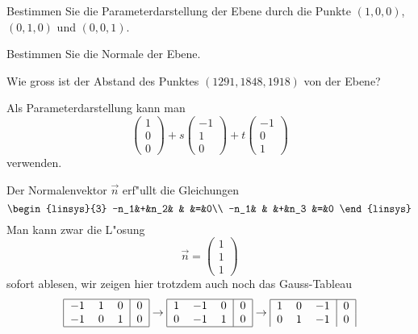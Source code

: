 \begin{teilaufgaben}
\item Bestimmen Sie die Parameterdarstellung der Ebene durch die
Punkte $(1,0,0)$, $(0,1,0)$ und $(0,0,1)$.
\item Bestimmen Sie die Normale der Ebene.
\item Wie gross ist der Abstand des Punktes $(1291, 1848, 1918)$ von
der Ebene?
\end{teilaufgaben}

\begin{loesung}
\begin{teilaufgaben}
\item Als Parameterdarstellung kann man
\[
\begin{pmatrix}1\\0\\0\end{pmatrix}
+s\begin{pmatrix}-1\\1\\0\end{pmatrix}
+t\begin{pmatrix}-1\\0\\1\end{pmatrix}
\]
verwenden.
\item  Der Normalenvektor $\vec n$ erf"ullt die Gleichungen
\[
\begin{linsys}{3}
-n_1&+&n_2& &    &=&0\\
-n_1& &   &+&n_3 &=&0
\end{linsys}
\]
Man kann zwar die L"osung
\[
\vec n=
\begin{pmatrix}1\\1\\1\end{pmatrix}
\]
sofort ablesen, wir zeigen hier trotzdem auch noch das Gauss-Tableau
\[
\begin{tabular}{|ccc|c|}
\hline
$-1$&1&0&0\\
$-1$&0&1&0\\
\hline
\end{tabular}
\rightarrow
\begin{tabular}{|ccc|c|}
\hline
1&$-1$&0&0\\
0&$-1$&1&0\\
\hline
\end{tabular}
\rightarrow
\begin{tabular}{|ccc|c|}
\hline
1& 0&$-1$&0\\
0& 1&$-1$&0\\

\end{tabular}\]
\end{teilaufgaben}
\end{loesung}
